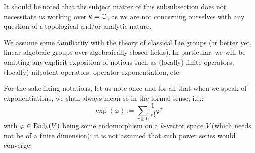             \begin{remark}
                It should be noted that the subject matter of this subsubsection does not necessitate us working over $k = \mathbb{C}$, as we are not concerning ourselves with any question of a topological and/or analytic nature.
            \end{remark}
            \begin{convention}
                We assume some familiarity with the theory of classical Lie groups (or better yet, linear algebraic groups over algebraically closed fields). In particular, we will be omitting any explicit exposition of notions such as (locally) finite operators, (locally) nilpotent operators, operator exponentiation, etc.
                
                For the sake fixing notations, let us note once and for all that when we speak of exponentiations, we shall always mean so in the formal sense, i.e.:
                    $$\exp(\varphi) := \sum_{r \geq 0} \frac{1}{r!} \varphi^r$$
                with $\varphi \in \mathrm{End}_k(V)$ being some endomorphism on a $k$-vector space $V$ (which needs not be of a finite dimension); it is not assumed that such power series would converge.
            \end{convention}
            
